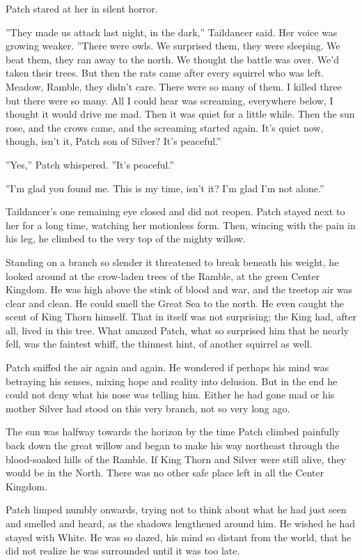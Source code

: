 \documentclass[12pt]{book}
\begin{document}
 Patch stared at her in silent horror.\par
 ''They made us attack last night, in the dark,'' Taildancer said. Her voice was growing weaker. ''There were owls. We surprised them, they were sleeping. We beat them, they ran away to the north. We thought the battle was over. We'd taken their trees. But then the rats came after every squirrel who was left. Meadow, Ramble, they didn't care. There were so many of them. I killed three but there were so many. All I could hear was screaming, everywhere below, I thought it would drive me mad. Then it was quiet for a little while. Then the sun rose, and the crows came, and the screaming started again. It's quiet now, though, isn't it, Patch son of Silver? It's peaceful.''\par
 ''Yes,'' Patch whispered. ''It's peaceful.''\par
 ''I'm glad you found me. This is my time, isn't it? I'm glad I'm not alone.''\par
 Taildancer's one remaining eye closed and did not reopen. Patch stayed next to her for a long time, watching her motionless form. Then, wincing with the pain in his leg, he climbed to the very top of the mighty willow.\par
Standing on a branch so slender it threatened to break beneath his weight, he looked around at the crow-laden trees of the Ramble, at the green Center Kingdom. He was high above the stink of blood and war, and the treetop air was clear and clean. He could smell the Great Sea to the north. He even caught the scent of King Thorn himself. That in itself was not surprising; the King had, after all, lived in this tree. What amazed Patch, what so surprised him that he nearly fell, was the faintest whiff, the thinnest hint, of another squirrel as well.\par
 Patch sniffed the air again and again. He wondered if perhaps his mind was betraying his senses, mixing hope and reality into delusion. But in the end he could not deny what his nose was telling him. Either he had gone mad %
 or his mother Silver had stood on this very branch, not so very long ago.\par
 The sun was halfway towards the horizon by the time Patch climbed painfully back down the great willow and began to make his way northeast through the blood-soaked hills of the Ramble. If King Thorn and Silver were still alive, they would be in the North. There was no other safe place left in all the Center Kingdom.\par
 Patch limped numbly onwards, trying not to think about what he had just seen and smelled and heard, as the shadows lengthened around him. He wished he had stayed with White. He was so dazed, his mind so distant from the world, that he did not realize he was surrounded until it was too late.\par
\end{document}
